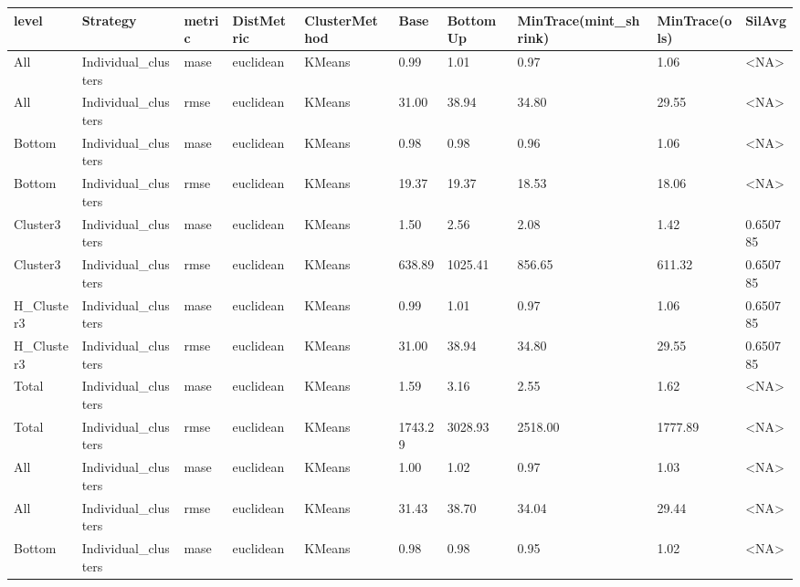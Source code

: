 \begin{tabular}{llllllllll}
\toprule
      level &            Strategy & metric & DistMetric & ClusterMethod &    Base & BottomUp & MinTrace(mint\_shrink) & MinTrace(ols) &    SilAvg \\
\midrule
        All & Individual\_clusters &   mase &  euclidean &        KMeans &    0.99 &     1.01 &                  0.97 &          1.06 &      <NA> \\
        All & Individual\_clusters &   rmse &  euclidean &        KMeans &   31.00 &    38.94 &                 34.80 &         29.55 &      <NA> \\
     Bottom & Individual\_clusters &   mase &  euclidean &        KMeans &    0.98 &     0.98 &                  0.96 &          1.06 &      <NA> \\
     Bottom & Individual\_clusters &   rmse &  euclidean &        KMeans &   19.37 &    19.37 &                 18.53 &         18.06 &      <NA> \\
   Cluster3 & Individual\_clusters &   mase &  euclidean &        KMeans &    1.50 &     2.56 &                  2.08 &          1.42 &  0.650785 \\
   Cluster3 & Individual\_clusters &   rmse &  euclidean &        KMeans &  638.89 &  1025.41 &                856.65 &        611.32 &  0.650785 \\
 H\_Cluster3 & Individual\_clusters &   mase &  euclidean &        KMeans &    0.99 &     1.01 &                  0.97 &          1.06 &  0.650785 \\
 H\_Cluster3 & Individual\_clusters &   rmse &  euclidean &        KMeans &   31.00 &    38.94 &                 34.80 &         29.55 &  0.650785 \\
      Total & Individual\_clusters &   mase &  euclidean &        KMeans &    1.59 &     3.16 &                  2.55 &          1.62 &      <NA> \\
      Total & Individual\_clusters &   rmse &  euclidean &        KMeans & 1743.29 &  3028.93 &               2518.00 &       1777.89 &      <NA> \\
        All & Individual\_clusters &   mase &  euclidean &        KMeans &    1.00 &     1.02 &                  0.97 &          1.03 &      <NA> \\
        All & Individual\_clusters &   rmse &  euclidean &        KMeans &   31.43 &    38.70 &                 34.04 &         29.44 &      <NA> \\
     Bottom & Individual\_clusters &   mase &  euclidean &        KMeans &    0.98 &     0.98 &                  0.95 &          1.02 &      <NA> \\

\end{tabular}
